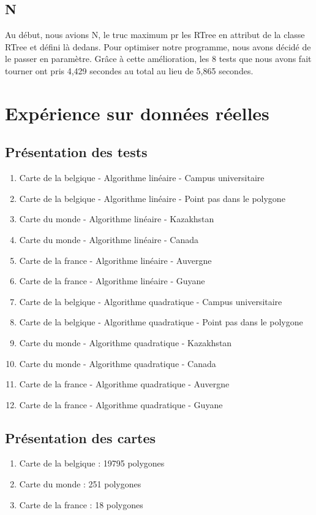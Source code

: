 \documentclass[utf8]{article}
\begin{document}
\begin{large}
  \subsection{N}
  \par
  \indent
  Au début, nous avions N, le truc maximum pr les RTree en attribut de la classe RTree et défini là dedans.
  Pour optimiser notre programme, nous avons décidé de le passer en paramètre.
  Grâce à cette amélioration, les 8 tests que nous avons fait tourner ont pris
  4,429 secondes au total au lieu de 5,865 secondes.


  \section{Expérience sur données réelles}
  \subsection{Présentation des tests}
  \begin{enumerate}
    \item Carte de la belgique - Algorithme linéaire - Campus universitaire
    \item Carte de la belgique - Algorithme linéaire - Point pas dans le polygone
    \item Carte du monde - Algorithme linéaire - Kazakhstan
    \item Carte du monde - Algorithme linéaire - Canada
    \item Carte de la france - Algorithme linéaire - Auvergne
    \item Carte de la france - Algorithme linéaire - Guyane
    \item Carte de la belgique - Algorithme quadratique - Campus universitaire
    \item Carte de la belgique - Algorithme quadratique - Point pas dans le polygone
    \item Carte du monde - Algorithme quadratique - Kazakhstan
    \item Carte du monde - Algorithme quadratique - Canada
    \item Carte de la france - Algorithme quadratique - Auvergne
    \item Carte de la france - Algorithme quadratique - Guyane
  \end{enumerate}

  \subsection{Présentation des cartes}
  \begin{enumerate}
    \item Carte de la belgique : 19795 polygones
    \item Carte du monde : 251 polygones
    \item Carte de la france : 18 polygones
  \end{enumerate}





\end{large}
\end{document}
